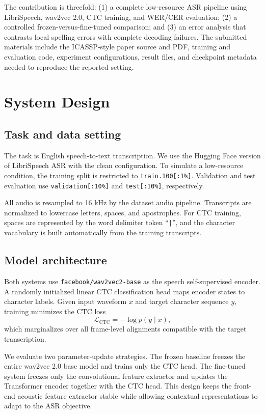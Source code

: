 \documentclass{article}
\begin{document}
The contribution is threefold: (1) a complete low-resource ASR pipeline using LibriSpeech, wav2vec 2.0, CTC training, and WER/CER evaluation; (2) a controlled frozen-versus-fine-tuned comparison; and (3) an error analysis that contrasts local spelling errors with complete decoding failures. The submitted materials include the ICASSP-style paper source and PDF, training and evaluation code, experiment configurations, result files, and checkpoint metadata needed to reproduce the reported setting.

\section{System Design}
\label{sec:method}

\subsection{Task and data setting}

The task is English speech-to-text transcription. We use the Hugging Face version of LibriSpeech ASR \cite{panayotov2015librispeech} with the clean configuration. To simulate a low-resource condition, the training split is restricted to \texttt{train.100[:1\%]}. Validation and test evaluation use \texttt{validation[:10\%]} and \texttt{test[:10\%]}, respectively.

All audio is resampled to 16 kHz by the dataset audio pipeline. Transcripts are normalized to lowercase letters, spaces, and apostrophes. For CTC training, spaces are represented by the word delimiter token ``\texttt{|}'', and the character vocabulary is built automatically from the training transcripts.

\subsection{Model architecture}

Both systems use \texttt{facebook/wav2vec2-base} as the speech self-supervised encoder. A randomly initialized linear CTC classification head maps encoder states to character labels. Given input waveform $x$ and target character sequence $y$, training minimizes the CTC loss
\begin{equation}
  \mathcal{L}_{\mathrm{CTC}} = -\log p(y \mid x),
\end{equation}
which marginalizes over all frame-level alignments compatible with the target transcription.

We evaluate two parameter-update strategies. The frozen baseline freezes the entire wav2vec 2.0 base model and trains only the CTC head. The fine-tuned system freezes only the convolutional feature extractor and updates the Transformer encoder together with the CTC head. This design keeps the front-end acoustic feature extractor stable while allowing contextual representations to adapt to the ASR objective.
\end{document}
